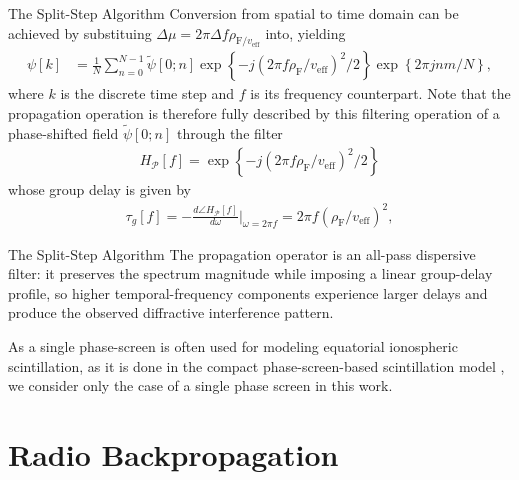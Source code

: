 \documentclass[10pt]{beamer}
\begin{document}
\begin{frame}{The Split-Step Algorithm}
    Conversion from spatial to time domain can be achieved by substituing $\Delta \mu = 2 \pi \Delta f \rho_{\mathrm{F} / v_{\mathrm{eff}}}$ into, yielding
    \begin{align}
        \psi\left[ k \right] &= \frac{1}{N} \sum_{n=0}^{N-1} \tilde{\psi}\left[0; n\right]
        \exp \left\{ -j\left( 2\pi f \rho_{\mathrm{F}} / v_{\mathrm{eff}} \right)^2 /2 \right\}
        \exp \left\{ 2\pi j n m /N \right\} \mathrm{,}
    \end{align}
    where $k$ is the discrete time step and $f$ is its frequency counterpart. Note that the propagation operation is therefore fully described by this filtering operation of a phase-shifted field $\tilde{\psi}\left[0; n\right]$ through the filter
    \begin{align}
        H_{\mathcal{P}} \left[ f \right] = \exp \left\{ -j\left( 2\pi f \rho_{\mathrm{F}} / v_{\mathrm{eff}} \right)^2 /2 \right\}
    \end{align}
    whose group delay is given by
    \begin{align}
        \tau_{g} \left[ f \right] = -\frac{d \angle H_{\mathcal{P}} \left[ f \right]}{d \omega} \bigg \vert_{\omega = 2 \pi f} = 2 \pi f \left( \rho_{\mathrm{F}} / v_{\mathrm{eff}} \right)^2 \mathrm{,}
    \end{align}
\end{frame}

\begin{frame}{The Split-Step Algorithm}
    The propagation operator is an all-pass dispersive filter: it preserves the spectrum magnitude while imposing a linear group-delay profile, so higher temporal-frequency components experience larger delays and produce the observed diffractive interference pattern.

    As a single phase-screen is often used for modeling equatorial ionospheric scintillation, as it is done in the compact phase-screen-based scintillation model \parencite{rinoCompactMultifrequencyGNSS2018}, we consider only the case of a single phase screen in this work.
\end{frame}

\section{Radio Backpropagation}
\end{document}
